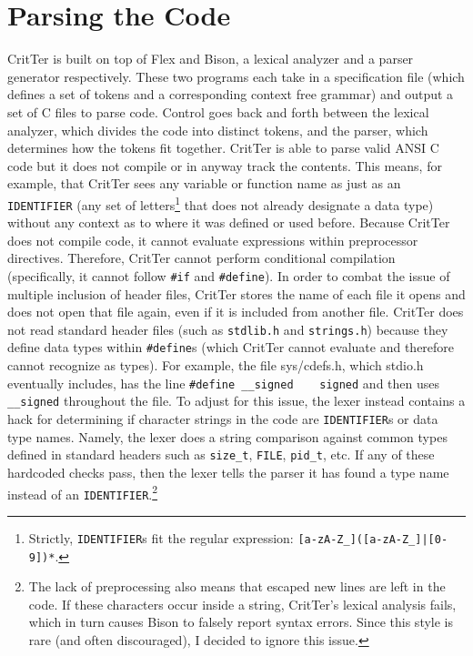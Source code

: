 \documentclass[12pt]{report}
\newcommand{\programName}{CritTer\xspace}
\begin{document}
\section{Parsing the Code}
\label{parsingTheCode}

\programName is built on top of Flex and Bison, a lexical analyzer and a  parser generator respectively. 
These two programs each take in a specification file (which defines a set of tokens and a corresponding 
context free grammar) and output a set of C files to parse code. Control goes back and forth between the 
lexical analyzer, which divides the code into distinct tokens, and the parser, which determines how the 
tokens fit together. \programName is able to parse valid ANSI C code but it does not compile or in 
anyway track the contents. This means, for example, that \programName sees any variable or function 
name as just as an \lstinline{IDENTIFIER} (any set of letters\footnote{Strictly, \lstinline{IDENTIFIER}s fit 
the regular expression: \lstinline{[a-zA-Z_]([a-zA-Z_]|[0-9])*}.} that does not already designate a data 
type) without any context as to where it was defined or used before. Because \programName does not 
compile code, it cannot evaluate expressions within preprocessor directives. Therefore, \programName 
cannot perform conditional compilation (specifically, it cannot follow \lstinline{#if} and \lstinline{#define}). 
In order to combat the issue of multiple inclusion of header files, \programName stores the name of each 
file it opens and does not open that file again, even if it is included from another file. \programName does 
not read standard header files (such as \lstinline{stdlib.h} and \lstinline{strings.h}) because they define 
data types within \lstinline{#define}s (which \programName cannot evaluate and therefore cannot 
recognize as types). For example, the file sys/cdefs.h, which stdio.h eventually includes, has the line 
\lstinline{#define __signed    signed} and then uses \lstinline{__signed} throughout the file. To adjust for 
this issue, the lexer instead contains a hack for determining if character strings in the code are 
\lstinline{IDENTIFIER}s or data type names. Namely, the lexer does a string comparison against common 
types defined in standard headers such as \lstinline{size_t}, \lstinline{FILE}, \lstinline{pid_t}, etc. If any of 
these hardcoded checks pass, then the lexer tells the parser it has found a type name instead of an 
\lstinline{IDENTIFIER}.\footnote{The lack of preprocessing also means that escaped new lines are left in the code. If these characters occur inside a string, \programName's lexical analysis fails, which in turn causes Bison to falsely report syntax errors. Since this style is rare (and often discouraged), I decided to ignore this issue.}
\end{document}
